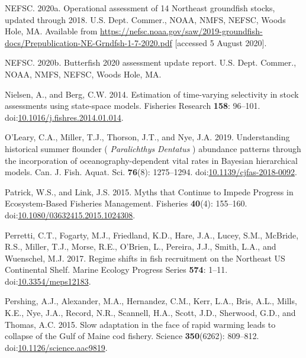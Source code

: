 \documentclass[]{article}
\begin{document}
\leavevmode\hypertarget{ref-nefsc2020Operational}{}%
NEFSC. 2020a. Operational assessment of 14 Northeast groundfish stocks,
updated through 2018. U.S. Dept. Commer., NOAA, NMFS, NEFSC, Woods Hole,
MA. Available from
\url{https://nefsc.noaa.gov/saw/2019-groundfish-docs/Prepublication-NE-Grndfsh-1-7-2020.pdf}
{[}accessed 5 August 2020{]}.

\leavevmode\hypertarget{ref-nefsc2020Butterfish}{}%
NEFSC. 2020b. Butterfish 2020 assessment update report. U.S. Dept.
Commer., NOAA, NMFS, NEFSC, Woods Hole, MA.

\leavevmode\hypertarget{ref-nielsen2014Estimation}{}%
Nielsen, A., and Berg, C.W. 2014. Estimation of time-varying selectivity
in stock assessments using state-space models. Fisheries Research
\textbf{158}: 96--101.
doi:\href{https://doi.org/10.1016/j.fishres.2014.01.014}{10.1016/j.fishres.2014.01.014}.

\leavevmode\hypertarget{ref-oleary2019Understanding}{}%
O'Leary, C.A., Miller, T.J., Thorson, J.T., and Nye, J.A. 2019.
Understanding historical summer flounder ( \emph{Paralichthys}
\emph{Dentatus} ) abundance patterns through the incorporation of
oceanography-dependent vital rates in Bayesian hierarchical models. Can.
J. Fish. Aquat. Sci. \textbf{76}(8): 1275--1294.
doi:\href{https://doi.org/10.1139/cjfas-2018-0092}{10.1139/cjfas-2018-0092}.

\leavevmode\hypertarget{ref-patrick2015Myths}{}%
Patrick, W.S., and Link, J.S. 2015. Myths that Continue to Impede
Progress in Ecosystem-Based Fisheries Management. Fisheries
\textbf{40}(4): 155--160.
doi:\href{https://doi.org/10.1080/03632415.2015.1024308}{10.1080/03632415.2015.1024308}.

\leavevmode\hypertarget{ref-perretti2017Regime}{}%
Perretti, C.T., Fogarty, M.J., Friedland, K.D., Hare, J.A., Lucey, S.M.,
McBride, R.S., Miller, T.J., Morse, R.E., O'Brien, L., Pereira, J.J.,
Smith, L.A., and Wuenschel, M.J. 2017. Regime shifts in fish recruitment
on the Northeast US Continental Shelf. Marine Ecology Progress Series
\textbf{574}: 1--11.
doi:\href{https://doi.org/10.3354/meps12183}{10.3354/meps12183}.

\leavevmode\hypertarget{ref-pershing2015Slow}{}%
Pershing, A.J., Alexander, M.A., Hernandez, C.M., Kerr, L.A., Bris,
A.L., Mills, K.E., Nye, J.A., Record, N.R., Scannell, H.A., Scott, J.D.,
Sherwood, G.D., and Thomas, A.C. 2015. Slow adaptation in the face of
rapid warming leads to collapse of the Gulf of Maine cod fishery.
Science \textbf{350}(6262): 809--812.
doi:\href{https://doi.org/10.1126/science.aac9819}{10.1126/science.aac9819}.
\end{document}
